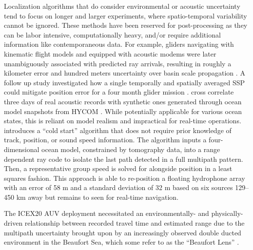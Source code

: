 Localization algorithms that do consider environmental or acoustic uncertainty tend to focus on longer and larger experiments, where spatio-temporal variability cannot be ignored.
These methods have been reserved for post-processing as they can be labor intensive, computationally heavy, and/or require additional information like contemporaneous data.
For example, gliders navigating with kinematic flight models and equipped with acoustic modems were later unambiguously associated with predicted ray arrivals, resulting in roughly a kilometer error and hundred meters uncertainty over basin scale propagation \cite{van_uffelen_estimating_2013}.
A follow up study investigated how a single temporally and spatially averaged SSP could mitigate position error for a four month glider mission \cite{van_uffelen_localization_2016}.
\citet{wu_assessment_2018} cross correlate three days of real acoustic records with synthetic ones generated through ocean model snapshots from HYCOM \cite{chassignet_hycom_2007}.
While potentially applicable for various ocean states, this is reliant on model realism and impractical for real-time operations.
\citet{mikhalevsky_deep_2020} introduces a ``cold start'' algorithm that does not require prior knowledge of track, position, or sound speed information.
The algorithm inputs a four-dimensional ocean model, constrained by tomography data, into a range dependent ray code to isolate the last path detected in a full multipath pattern.
Then, a representative group speed is solved for alongside position in a least squares fashion. 
This approach is able to re-position a floating hydrophone array with an error of 58 m and a standard deviation of 32 m based on six sources 129--450 km away but remains to seen for real-time navigation.

The ICEX20 AUV deployment necessitated an environmentally- and physically-driven relationship between recorded travel time and estimated range due to the multipath uncertainty brought upon by an increasingly observed double ducted environment in the Beaufort Sea, which some refer to as the ``Beaufort Lens'' \citep{litvak2015acoustics,chen_spectral_2019,chen2020temporal}.

